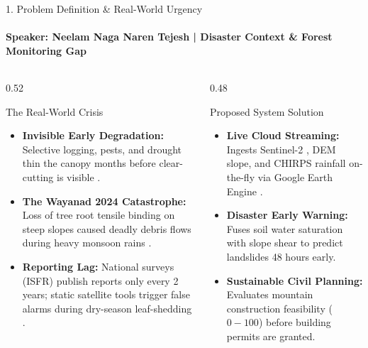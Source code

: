 \documentclass[aspectratio=169, 11pt]{beamer}
\let\oldcite\cite
\renewcommand{\cite}[1]{\hyperlink{ref:references_slide}{\textcolor{amritaMaroon}{\oldcite{#1}}}}
\begin{document}
\begin{frame}{1. Problem Definition \& Real-World Urgency}
    \framesubtitle{\textbf{\textcolor{amritaGold}{Speaker: Neelam Naga Naren Tejesh}} \quad | \quad Disaster Context \& Forest Monitoring Gap}
    \begin{columns}[c]
        \begin{column}{0.52\textwidth}
            \begin{block}{The Real-World Crisis}
                \small
                \begin{itemize}
                    \item \textbf{Invisible Early Degradation:} Selective logging, pests, and drought thin the canopy months before clear-cutting is visible \cite{hansen2013high}.
                    \item \textbf{The Wayanad 2024 Catastrophe:} Loss of tree root tensile binding on steep slopes caused deadly debris flows during heavy monsoon rains \cite{funk2015climate, guzzetti1999landslide}.
                    \item \textbf{Reporting Lag:} National surveys (ISFR) publish reports only every 2 years; static satellite tools trigger false alarms during dry-season leaf-shedding \cite{hansen2013high}.
                \end{itemize}
            \end{block}
        \end{column}
        \begin{column}{0.48\textwidth}
            \begin{exampleblock}{Proposed System Solution}
                \small
                \begin{itemize}
                    \item \textbf{Live Cloud Streaming:} Ingests Sentinel-2 \cite{drusch2012sentinel}, DEM slope, and CHIRPS rainfall on-the-fly via Google Earth Engine \cite{gorelick2017google}.
                    \item \textbf{Disaster Early Warning:} Fuses soil water saturation with slope shear to predict landslides 48 hours early.
                    \item \textbf{Sustainable Civil Planning:} Evaluates mountain construction feasibility ($0 - 100$) before building permits are granted.
                \end{itemize}
            \end{exampleblock}
        \end{column}
    \end{columns}
\end{frame}
\end{document}

